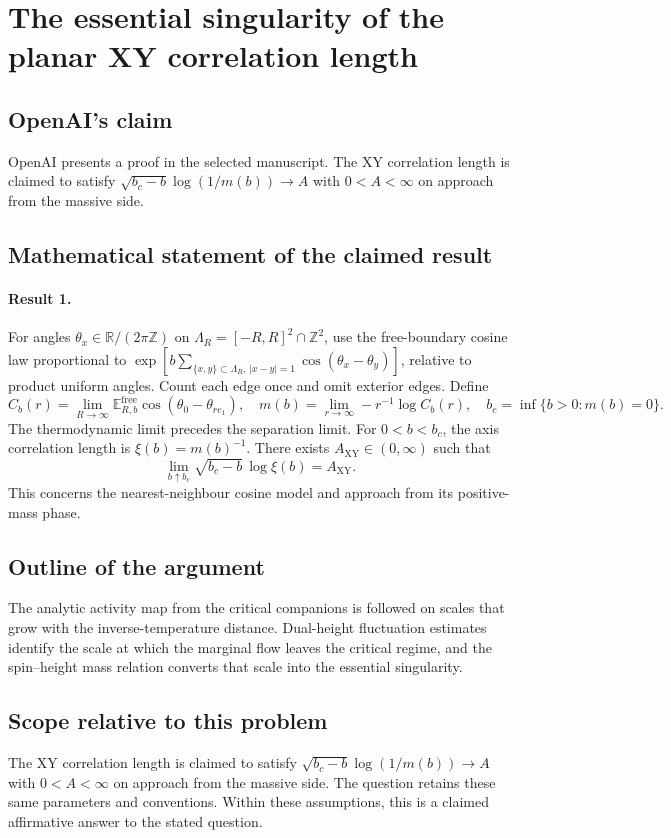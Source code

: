 \documentclass[11pt]{article}
\begin{document}
\section*{The essential singularity of the planar XY correlation length}

\subsection{OpenAI's claim}
OpenAI presents a proof in the selected manuscript. The XY correlation length is claimed to satisfy $\sqrt{b_c-b}\log(1/m(b))\to A$ with $0<A<\infty$ on approach from the massive side.

\subsection{Mathematical statement of the claimed result}
\paragraph{Result 1.} For angles $\theta_x\in\mathbb R/(2\pi\mathbb Z)$ on $\Lambda_R=[-R,R]^2\cap\mathbb Z^2$, use the free-boundary cosine law proportional to $\exp[b\sum_{\{x,y\}\subset\Lambda_R,\,|x-y|=1}\cos(\theta_x-\theta_y)]$, relative to product uniform angles. Count each edge once and omit exterior edges. Define
\[
 C_b(r)=\lim_{R\to\infty}\mathbb E_{R,b}^{\mathrm{free}}\cos(\theta_0-\theta_{re_1}),\quad
 m(b)=\lim_{r\to\infty}-r^{-1}\log C_b(r),\quad b_c=\inf\{b>0:m(b)=0\}.
\]
The thermodynamic limit precedes the separation limit. For $0<b<b_c$, the axis correlation length is $\xi(b)=m(b)^{-1}$. There exists $A_{\mathrm{XY}}\in(0,\infty)$ such that
\[
 \lim_{b\uparrow b_c}\sqrt{b_c-b}\,\log\xi(b)=A_{\mathrm{XY}}.
\]
This concerns the nearest-neighbour cosine model and approach from its positive-mass phase.

\subsection{Outline of the argument}
The analytic activity map from the critical companions is followed on scales that grow with the inverse-temperature distance. Dual-height fluctuation estimates identify the scale at which the marginal flow leaves the critical regime, and the spin--height mass relation converts that scale into the essential singularity.

\subsection{Scope relative to this problem}
The XY correlation length is claimed to satisfy $\sqrt{b_c-b}\log(1/m(b))\to A$ with $0<A<\infty$ on approach from the massive side. The question retains these same parameters and conventions. Within these assumptions, this is a claimed affirmative answer to the stated question.
\end{document}
